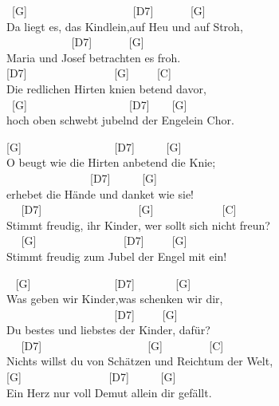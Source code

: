 \documentclass[
  letterpaper,
  twoside=false]{scrbook}
\begin{document}
~{[}G{]} ~ ~ ~ ~ ~ ~ ~ ~ ~ ~ ~ {[}D7{]} ~ ~ ~ ~{[}G{]} ~\\
Da liegt es, das Kindlein,auf Heu und auf Stroh,\\
\hspace*{0.333em} ~ ~ ~ ~ ~ ~ ~ {[}D7{]} ~ ~ ~ ~{[}G{]} ~ ~\\
Maria und Josef betrachten es froh.\\
\hspace*{0.333em} {[}D7{]} ~ ~ ~ ~ ~ ~ ~ ~ ~ {[}G{]} ~ ~ ~{[}C{]} ~ ~\\
Die redlichen Hirten knien betend davor,\\
\hspace*{0.333em} ~{[}G{]} ~ ~ ~ ~ ~ ~ ~ ~ ~ ~ ~{[}D7{]} ~ ~ {[}G{]} ~
~\\
hoch oben schwebt jubelnd der Engelein Chor.

{[}G{]} ~ ~ ~ ~ ~ ~ ~ ~ ~ ~{[}D7{]} ~ ~ ~ {[}G{]} ~\\
O beugt wie die Hirten anbetend die Knie;\\
\hspace*{0.333em} ~ ~ ~ ~ ~ ~ ~ ~ ~ {[}D7{]} ~ ~ ~ {[}G{]} ~ ~\\
erhebet die Hände und danket wie sie!\\
\hspace*{0.333em} ~ ~{[}D7{]} ~ ~ ~ ~ ~ ~ ~ ~ ~ ~ {[}G{]} ~ ~ ~ ~ ~ ~ ~
{[}C{]} ~ ~\\
Stimmt freudig, ihr Kinder, wer sollt\textquotesingle{} sich nicht
freun?\\
\hspace*{0.333em} ~ ~{[}G{]} ~ ~ ~ ~ ~ ~ ~ ~ ~ {[}D7{]} ~ ~ ~{[}G{]} ~ ~
~ ~\\
Stimmt freudig zum Jubel der Engel mit ein!

~ {[}G{]} ~ ~ ~ ~ ~ ~ ~ ~ ~{[}D7{]} ~ ~ ~ ~ {[}G{]} ~\\
Was geben wir Kinder,was schenken wir dir,\\
\hspace*{0.333em} ~ ~ ~ ~ ~ ~ ~ ~ ~ ~ ~ ~{[}D7{]} ~ ~ ~{[}G{]} ~ ~\\
Du bestes und liebstes der Kinder, dafür?\\
\hspace*{0.333em} ~ ~{[}D7{]} ~ ~ ~ ~ ~ ~ ~ ~ ~ ~ ~ {[}G{]} ~ ~ ~ ~
~{[}C{]} ~ ~ ~ ~\\
Nichts willst du von Schätzen und Reichtum der Welt,\\
\hspace*{0.333em} {[}G{]} ~ ~ ~ ~ ~ ~ ~ ~ ~ {[}D7{]} ~ ~ ~ {[}G{]} ~ ~ ~
~\\
Ein Herz nur voll Demut allein dir gefällt.
\end{document}
